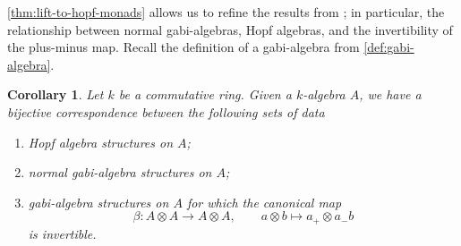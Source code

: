 \documentclass[12pt,dvipsnames,oneside]{amsart}
\theoremstyle{plain}
\newtheorem{corollary}[proposition]{Corollary}
\theoremstyle{remark}
\theoremstyle{definition}
\begin{document}
\cref{thm:lift-to-hopf-monads} allows us to refine the results from \cite[\S5.3]{Berger-Vercruysse-Saracco}; in particular, the relationship between normal gabi-algebras, Hopf algebras, and the invertibility of the plus-minus map.
Recall the definition of a gabi-algebra from \cref{def:gabi-algebra}.

\begin{corollary}\label{cor:gabi-in-the-com-case}
  Let \(k\) be a commutative ring.
  Given a \(k\)-algebra \(A\), we have a bijective correspondence between the following sets of data
  \begin{enumerate}[label=\textnormal{(\alph*)},leftmargin=0.8cm]
    \item\label{item:gabi-Hopf1} Hopf algebra structures on \(A\);
    \item\label{item:gabi-Hopf2} normal gabi-algebra structures on \(A\);
    \item\label{item:gabi-Hopf3} gabi-algebra structures on \(A\) for which the canonical map
    \begin{equation}
      \beta \colon A \otimes A \to A \otimes A, \qquad a\otimes b \mapsto a_+ \otimes a_-b
    \end{equation}
    is invertible.
  \end{enumerate}
\end{corollary}
\end{document}
